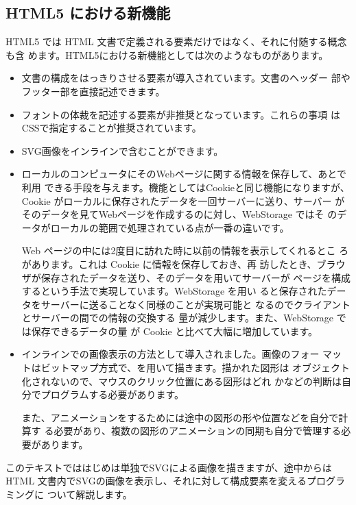 \subsection{HTML5 における新機能}
HTML5 では HTML 文書で定義される要素だけではなく、それに付随する概念も含
めます。HTML5における新機能としては次のようなものがあります。
\begin{itemize}
 \item 文書の構成をはっきりさせる要素が導入されています。文書のヘッダー
       部やフッター部を直接記述できます。
 \item フォントの体裁を記述する要素が非推奨となっています。これらの事項
       はCSSで指定することが推奨されています。
 \item SVG画像をインラインで含むことができます。

 \item {}

ローカルのコンピュータにそのWebページに関する情報を保存して、あとで利用
       できる手段を与えます。機能としてはCookieと同じ機能になりますが、
       Cookie がローカルに保存されたデータを一回サーバーに送り、サーバー
       がそのデータを見てWebページを作成するのに対し、WebStorage ではそ
       のデータがローカルの範囲で処理されている点が一番の違いです。

       Web ページの中には2度目に訪れた時に以前の情報を表示してくれるとこ
       ろがあります。これは Cookie に情報を保存しておき、再
       訪したとき、ブラウザが保存されたデータを送り、そのデータを用いてサーバーが
       ページを構成するという手法で実現しています。WebStorage を用い
       ると保存されたデータをサーバーに送ることなく同様のことが実現可能と
       なるのでクライアントとサーバーの間での情報の交換する
       量が減少します。また、WebStorage では保存できるデータの量
       が Cookie と比べて大幅に増加しています。
 \item {}

       インラインでの画像表示の方法として導入されました。画像のフォー
       マットはビットマップ方式で、\JS を用いて描きます。描かれた図形は
       オブジェクト化されないので、マウスのクリック位置にある図形はどれ
       かなどの判断は自分でプログラムする必要があります。

また、アニメーションをするためには途中の図形の形や位置などを自分で計算す
       る必要があり、複数の図形のアニメーションの同期も自分で管理する必
       要があります。

			 \iffalse
似たような形で図形を表示する
       \keyitem{Processing}\footnote{\url{http://processig.org}}という言
       語があります。図形の描き方の手順はほとんど同じです。
       実際にProcessing のプログラムをエミュレー
       トして\ElmH{canvas}に表示する
       \texttt{processing.js}\footnote{\url{http://processingjs.org}}というラ
       イブラリーも存在します。
			 \fi
\end{itemize}
このテキストでははじめは単独でSVGによる画像を描きますが、途中からはHTML
文書内でSVGの画像を表示し、それに対して構成要素を変えるプログラミングに
ついて解説します。